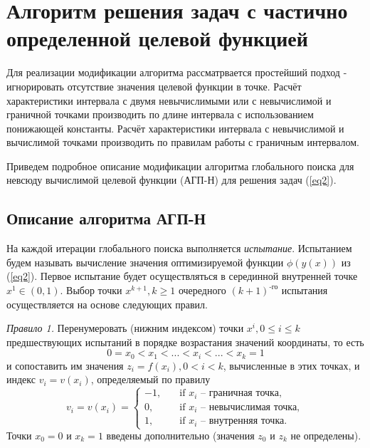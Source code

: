 \documentclass[10pt,a4paper]{book}
\begin{document}
\section{Алгоритм решения задач с частично определенной целевой функцией}

Для реализации модификации алгоритма рассматрвается простейший подход - игнорировать отсутствие значения целевой функции в точке. Расчёт характеристики интервала с двумя невычислимыми или с невычислимой и граничной точками производить по длине интервала с использованием понижающей константы. Расчёт характеристики интервала с невычислимой и вычислимой точками производить по правилам работы с граничным интервалом.

Приведем подробное описание модификации алгоритма глобального поиска для невсюду вычислимой целевой функции (АГП-Н) для решения задач (\ref{eq2}).


\subsection{Описание алгоритма АГП-Н}

На каждой итерации глобального поиска выполняется \textit{испытание}. Испытанием будем называть вычисление значения оптимизируемой функции $\phi (y(x))$ из (\ref{eq2}). Первое испытание будет осуществляться в серединной внутренней точке $x^1 \in (0,1)$. Выбор точки $x^{k+1}, k \geq 1$ очередного $(k+1)^\text{-го}$ испытания осуществляется на основе следующих правил.

\textit{Правило 1.} Перенумеровать (нижним индексом) точки $x^i, 0 \leq i \leq k$ предшествующих испытаний в порядке возрастания значений координаты, то есть
\begin{equation}\label{eq5} 
0=x_0 < x_1 < ... < x_i < ... < x_{k}=1
\end{equation}
и сопоставить им значения $z_i=f(x_i), 0 < i < k$, вычисленные в этих точках, и индекс $v_i=v(x_i)$, определяемый по правилу
\begin{equation}\label{eq6} 
v_i=v(x_i)=
  \begin{cases}
    -1, & {\quad \text{if } x_i \text{ -- граничная точка}},\\
    0, & {\quad \text{if } x_i \text{ -- невычислимая точка}},\\
    1, & {\quad \text{if } x_i \text{ -- внутренняя точка}}.
  \end{cases}
\end{equation}
Точки $x_0=0$ и $x_{k}=1$ введены дополнительно (значения $z_0$ и $z_{k}$ не определены).
\end{document}
